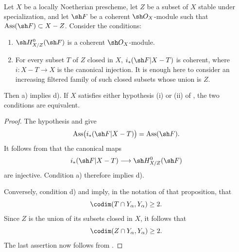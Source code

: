 \begin{corollary}[5.11.5]
\label{IV.5.11.5}
Let $X$ be a locally Noetherian prescheme, let $Z$ be a subset
of $X$ stable under specialization, and let $\sh F$ be a coherent
$\sh O_X$-module such that
$\operatorname{Ass}(\sh F)\subset X-Z$.  Consider the conditions:
\begin{enumerate}[{\rm a)}]
  \item $\sh H^0_{X/Z}(\sh F)$ is a coherent
  $\sh O_X$-module.
  \item[{\rm d)}] For every subset $T$ of $Z$ closed in $X$,
  $i_*(\sh F|X-T)$ is coherent, where
  $i:X-T\to X$ is the canonical injection.  It is enough here
  to consider an increasing filtered family of such closed
  subsets whose union is $Z$.
\end{enumerate}
Then {\rm a)} implies {\rm d)}.  If $X$ satisfies either
hypothesis {\rm(i)} or {\rm(ii)} of , the two
conditions are equivalent.
\end{corollary}

\begin{proof}
The hypothesis and  give
\[
  \operatorname{Ass}\bigl(i_*(\sh F|X-T)\bigr)
  =\operatorname{Ass}(\sh F).
\]
It follows from  that the canonical maps
\[
  i_*(\sh F|X-T)\longrightarrow\sh H^0_{X/Z}(\sh F)
\]
are injective.  Condition {\rm a)} therefore implies {\rm d)}.


Conversely, condition {\rm d)} and  imply, in
the notation of that proposition, that
\[
  \codim(T\cap Y_\alpha,Y_\alpha)\geq2.
\]
Since $Z$ is the union of its subsets closed in $X$, it follows
that
\[
  \codim(Z\cap Y_\alpha,Y_\alpha)\geq2.
\]
The last assertion now follows from .
\end{proof}

